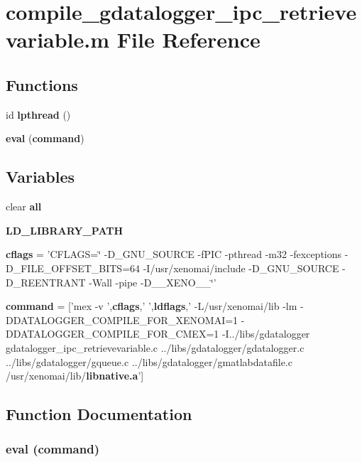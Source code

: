 \section{compile\_\-gdatalogger\_\-ipc\_\-retrievevariable.m File Reference}
\label{matlab_2compile__gdatalogger__ipc__retrievevariable_8m}
\subsection*{Functions}
\begin{DoxyCompactItemize}
\item 
id {\bf lpthread} ()
\item 
{\bf eval} ({\bf command})
\end{DoxyCompactItemize}
\subsection*{Variables}
\begin{DoxyCompactItemize}
\item 
clear {\bf all}
\item 
{\bf LD\_\-LIBRARY\_\-PATH}
\item 
{\bf cflags} = 'CFLAGS=\char`\"{} -\/D\_\-GNU\_\-SOURCE -\/fPIC -\/pthread -\/m32 -\/fexceptions -\/D\_\-FILE\_\-OFFSET\_\-BITS=64 -\/I/usr/xenomai/include -\/D\_\-GNU\_\-SOURCE -\/D\_\-REENTRANT -\/Wall -\/pipe -\/D\_\-\_\-XENO\_\-\_\-\char`\"{}'
\item 
{\bf command} = ['mex -\/v ',{\bf cflags},' ',{\bf ldflags},' -\/L/usr/xenomai/lib -\/lm -\/DDATALOGGER\_\-COMPILE\_\-FOR\_\-XENOMAI=1 -\/DDATALOGGER\_\-COMPILE\_\-FOR\_\-CMEX=1 -\/I../libs/gdatalogger gdatalogger\_\-ipc\_\-retrievevariable.c ../libs/gdatalogger/gdatalogger.c ../libs/gdatalogger/gqueue.c ../libs/gdatalogger/gmatlabdatafile.c /usr/xenomai/lib/{\bf libnative.a}']
\end{DoxyCompactItemize}


\subsection{Function Documentation}
\subsubsection[{eval}]{\setlength{\rightskip}{0pt plus 5cm}eval ({\bf command})}\label{matlab_2compile__gdatalogger__ipc__retrievevariable_8m_a8fe22a6e9d0e698497a018d24b19f6e7}
